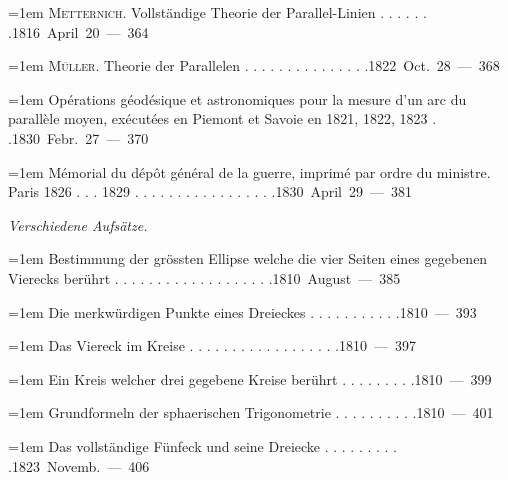 \par\noindent\hangindent=1em \textsc{Metternich}. Vollständige Theorie der Parallel-Linien . . . . . . .\hfill{}\hbox{}\nobreak\hfill\mbox{1816 April 20 — 364}\par
\par\noindent\hangindent=1em \textsc{Müller}. Theorie der Parallelen . . . . . . . . . . . . . . .\hfill{}\hbox{}\nobreak\hfill\mbox{1822 Oct. 28 — 368}\par
\par\noindent\hangindent=1em Opérations géodésique et astronomiques pour la mesure d’un arc du parallèle moyen, exécutées en Piemont et Savoie en 1821, 1822, 1823 . .\hfill{}\hbox{}\nobreak\hfill\mbox{1830 Febr. 27 — 370}\par
\par\noindent\hangindent=1em Mémorial du dépôt général de la guerre, imprimé par ordre du ministre. Paris 1826 . . . 1829 . . . . . . . . . . . . . . . . .\hfill{}\hbox{}\nobreak\hfill\mbox{1830 April 29 — 381}\par
\par\medskip{}
\noindent\textit{Verschiedene Aufsätze.}\par
\par\noindent\hangindent=1em Bestimmung der grössten Ellipse welche die vier Seiten eines gegebenen Vierecks berührt . . . . . . . . . . . . . . . . . . .\hfill{}\hbox{}\nobreak\hfill\mbox{1810 August — 385}\par
\par\noindent\hangindent=1em Die merkwürdigen Punkte eines Dreieckes . . . . . . . . . . .\hfill{}\hbox{}\nobreak\hfill\mbox{1810 — 393}\par
\par\noindent\hangindent=1em Das Viereck im Kreise . . . . . . . . . . . . . . . . . .\hfill{}\hbox{}\nobreak\hfill\mbox{1810 — 397}\par
\par\noindent\hangindent=1em Ein Kreis welcher drei gegebene Kreise berührt . . . . . . . . .\hfill{}\hbox{}\nobreak\hfill\mbox{1810 — 399}\par
\par\noindent\hangindent=1em Grundformeln der sphaerischen Trigonometrie . . . . . . . . . .\hfill{}\hbox{}\nobreak\hfill\mbox{1810 — 401}\par
\par\noindent\hangindent=1em Das vollständige Fünfeck und seine Dreiecke . . . . . . . . . .\hfill{}\hbox{}\nobreak\hfill\mbox{1823 Novemb. — 406}\par
